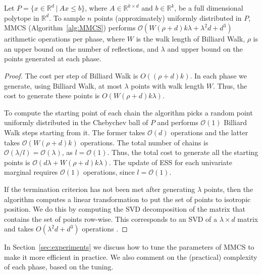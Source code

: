    
   \begin{lem}
     \label{lem:mmcs_complexity}
     Let $P=\{x\in\mathbb{R}^d\ |\ Ax\leq b\}$, where $A\in\mathbb{R}^{k\times d}$ and
     $b\in\mathbb{R}^k$, be a full dimensional polytope in $\mathbb{R}^d$.
     To sample $n$ points  (approximately) uniformly distributed in $P$,
     MMCS (Algorithm~\ref{alg:MMCS}) performs
     $\mathcal{O}(W(\rho + d)k\lambda + \lambda^2d + d^3)$
     arithmetic operations per phase, where $W$ is the walk length
     of Billiard Walk,
     $\rho$ is an upper bound on the number of reflections, and $\lambda$
     and upper bound on the points generated at each phase.
   \end{lem}
   
   \begin{proof}
       The cost per step of Billiard Walk is $O((\rho + d)k)$. In each phase we
       generate, using Billiard Walk, at most $\lambda$ points with walk length $W$.
       Thus, the cost to generate these points is $O(W(\rho + d)k\lambda)$.
     
        To compute the starting point of each chain the algorithm picks a random point
        uniformly distributed in the Chebychev ball of $P$ and performs $\mathcal{O}(1)$
        Billiard Walk steps starting from it.
        The former  takes $\mathcal{O}(d)$ operations and the latter  takes $\mathcal{O}(W(\rho + d)k)$ operations.
        The total number of chains is $\mathcal{O}(\lambda / l) = \mathcal{O}(\lambda)$, as $l=\mathcal{O}(1)$.
        Thus, the total cost to generate all the starting points is $\mathcal{O}(d\lambda + W(\rho + d)k\lambda)$. The update of ESS for each univariate marginal requires $\mathcal{O}(1)$ operations, since $l = \mathcal{O}(1)$.
     
        If the termination criterion has not been met after generating $\lambda$ points,
        then
        the algorithm computes a linear transformation to put the set of points to isotropic
        position. We do this by computing the SVD decomposition of the matrix that
        contains the set of points row-wise. This corresponds to an SVD of a
        $\lambda \times d$ matrix and takes $O(\lambda^2d + d^3)$ operations
        \cite{golub13}.
   \end{proof}

   In Section~\ref{sec:experiments} we discuss how to tune the parameters of MMCS
   to make it more efficient in practice. We also comment on the (practical)
   complexity of each phase, based on the tuning.





